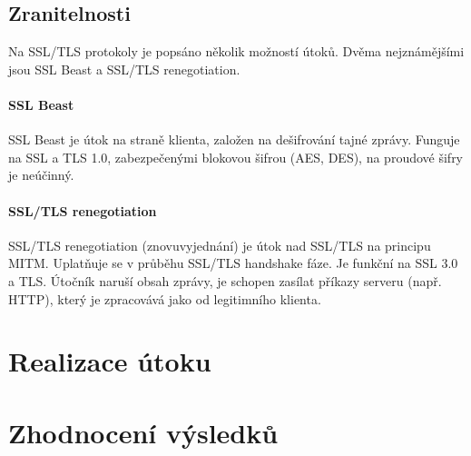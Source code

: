 \documentclass[10pt,a4paper,titlepage]{article}
\begin{document}
  \subsection*{Zranitelnosti}
  Na SSL/TLS protokoly je popsáno několik možností útoků. Dvěma nejznámějšími
  jsou SSL Beast a SSL/TLS renegotiation.
  
  \paragraph{SSL Beast}
  SSL Beast je útok na straně klienta, založen na dešifrování tajné zprávy.
  Funguje na SSL a TLS 1.0, zabezpečenými blokovou šifrou (AES, DES), na proudové
  šifry je neúčinný. \cite{sslbeast}

  \paragraph{SSL/TLS renegotiation}
  SSL/TLS renegotiation (znovuvyjednání) je útok nad SSL/TLS na principu MITM.
  Uplatňuje se v průběhu SSL/TLS handshake fáze. Je funkční na SSL 3.0 a TLS.
  Útočník naruší obsah zprávy, je schopen zasílat příkazy serveru (např. HTTP),
  který je zpracovává jako od legitimního klienta. \cite{sslrenegotiation}

  
  \section*{Realizace útoku}

  \section*{Zhodnocení výsledků}


  
  
  \printbibliography
\end{document}
